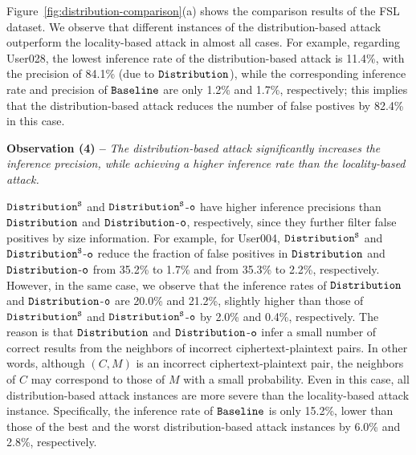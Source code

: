 
Figure~\ref{fig:distribution-comparison}(a) shows the
comparison results of the FSL dataset. We observe that different instances of
the distribution-based attack outperform the locality-based attack in almost
all cases. For example, regarding User028, the lowest inference rate of the
distribution-based attack is 11.4\%, with the precision of 84.1\% (due to $\tt
Distribution$), while the corresponding inference rate and precision of
$\tt Baseline$ are only 1.2\% and 1.7\%, respectively; this implies that the distribution-based attack reduces the number of false postives by 82.4\% in this case.   

{\bf Observation (4) --} {\em The distribution-based attack significantly
increases the inference precision, while achieving a higher inference rate than
the locality-based attack.} 

$\tt Distribution^S$ and $\tt Distribution^S$-$\tt o$ have higher inference
precisions than $\tt Distribution$ and $\tt Distribution$-$\tt o$,
respectively, since they further filter false positives by size information.
For example, for User004, $\tt Distribution^S$ and $\tt Distribution^S$-$\tt o$  reduce the fraction of false positives in  $\tt Distribution$ and $\tt Distribution$-$\tt o$ from 35.2\% to 1.7\% and from 35.3\% to 2.2\%, respectively. However, in the same case,    
 we observe that the inference rates of $\tt Distribution$ and $\tt Distribution$-$\tt o$ are 20.0\% and 21.2\%, slightly higher than those of  
$\tt Distribution^S$ and
$\tt Distribution^S$-$\tt o$ by 2.0\% and
0.4\%, respectively. The reason is that $\tt Distribution$ and $\tt
Distribution$-$\tt o$ infer a small number of correct results from the
neighbors of incorrect ciphertext-plaintext pairs. In other words,  although
$(C, M)$ is an incorrect ciphertext-plaintext pair, the neighbors of $C$ may
correspond to those of $M$ with a small probability. Even in this case, all distribution-based attack instances are more severe than the locality-based attack instance. Specifically, the inference rate of $\tt Baseline$ is only 15.2\%, lower than those of the best and the worst distribution-based attack instances by 6.0\% and 2.8\%, respectively. 

